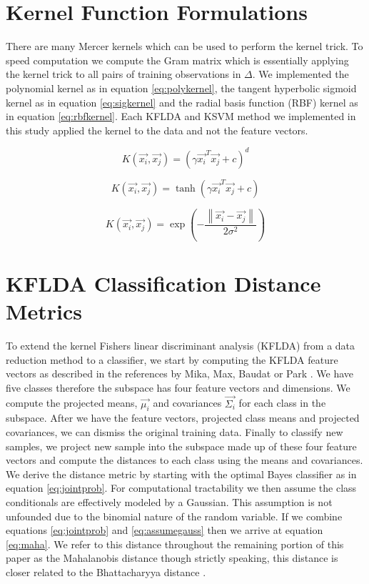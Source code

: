 \documentclass[journal]{IEEEtran}
\begin{document}
\section{Kernel Function Formulations}
\par There are many Mercer kernels which can be used to perform the kernel trick. To speed computation we compute the Gram matrix which is essentially applying the kernel trick to all pairs of training observations in \(\Delta\). We implemented the polynomial kernel as in equation \ref{eq:polykernel}, the tangent hyperbolic sigmoid kernel as in equation \ref{eq:sigkernel} and the radial basis function (RBF) kernel as in equation \ref{eq:rbfkernel}. Each KFLDA and KSVM method we implemented in this study applied the kernel to the data and not the feature vectors.

\begin{equation}
\label{eq:polykernel}
K(\vec{x_i}, \vec{x_j}) = (\gamma\vec{x_i}^T\vec{x_j} + c)^d
\end{equation}

\begin{equation}
\label{eq:sigkernel}
K(\vec{x_i}, \vec{x_j}) = \tanh(\gamma\vec{x_i}^T\vec{x_j} + c)
\end{equation}

\begin{equation}
\label{eq:rbfkernel}
K(\vec{x_i}, \vec{x_j}) = \exp{\left( -\frac{\left\| \vec{x_i} - \vec{x_j}\right\|}{2\sigma^2}\right)}
\end{equation}

\section{KFLDA Classification Distance Metrics}
\par To extend the kernel Fishers linear discriminant analysis (KFLDA) from a data reduction method to a classifier, we start by computing the KFLDA feature vectors as described in the references by Mika, Max, Baudat or Park \cite{mika}\cite{max}\cite{baudat}\cite{park}. We have five classes therefore the subspace has four feature vectors and dimensions. We compute the projected means, \(\vec{\mu_i}\) and covariances \(\vec{\Sigma_i}\) for each class in the subspace. After we have the feature vectors, projected class means and projected covariances, we can dismiss the original training data. Finally to classify new samples, we project new sample into the subspace made up of these four feature vectors and compute the distances to each class using the means and covariances. We derive the distance metric by starting with the optimal Bayes classifier as in equation \ref{eq:jointprob}. For computational tractability we then assume the class conditionals are effectively modeled by a Gaussian. This assumption is not unfounded due to the binomial nature of the random variable. If we combine equations \ref{eq:jointprob} and \ref{eq:assumegauss} then we arrive at equation \ref{eq:maha}. We refer to this distance throughout the remaining portion of this paper as the Mahalanobis distance though strictly speaking, this distance is closer related to the Bhattacharyya distance \cite[p.~166]{chang1}.
\end{document}
